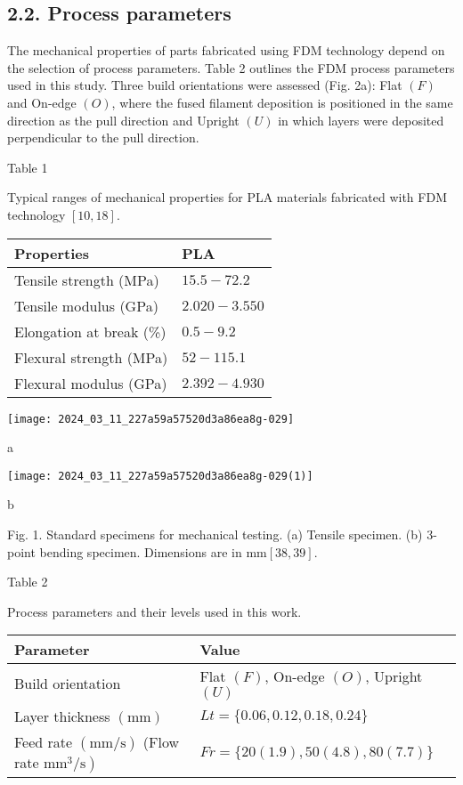 \documentclass[10pt]{article}
\begin{document}
\subsection*{2.2. Process parameters}
The mechanical properties of parts fabricated using FDM technology depend on the selection of process parameters. Table 2 outlines the FDM process parameters used in this study. Three build orientations were assessed (Fig. 2a): Flat $(F)$ and On-edge $(O)$, where the fused filament deposition is positioned in the same direction as the pull direction and Upright $(U)$ in which layers were deposited perpendicular to the pull direction.

Table 1

Typical ranges of mechanical properties for PLA materials fabricated with FDM technology $[10,18]$.

\begin{center}
\begin{tabular}{ll}
\hline
Properties & PLA \\
\hline
Tensile strength (MPa) & $15.5-72.2$ \\
Tensile modulus (GPa) & $2.020-3.550$ \\
Elongation at break (\%) & $0.5-9.2$ \\
Flexural strength (MPa) & $52-115.1$ \\
Flexural modulus (GPa) & $2.392-4.930$ \\
\hline
\end{tabular}
\end{center}

\begin{center}
\texttt{[image: 2024\_03\_11\_227a59a57520d3a86ea8g-029]}
\end{center}

a

\begin{center}
\texttt{[image: 2024\_03\_11\_227a59a57520d3a86ea8g-029(1)]}
\end{center}

b

Fig. 1. Standard specimens for mechanical testing. (a) Tensile specimen. (b) 3-point bending specimen. Dimensions are in $\mathrm{mm}[38,39]$.

Table 2

Process parameters and their levels used in this work.

\begin{center}
\begin{tabular}{ll}
\hline
Parameter & Value \\
\hline
Build orientation & Flat $(F)$, On-edge $(O)$, Upright $(U)$ \\
Layer thickness $(\mathrm{mm})$ & $L t=\{0.06,0.12,0.18,0.24\}$ \\
Feed rate $(\mathrm{mm} / \mathrm{s})$ (Flow rate $\left.\mathrm{mm}^{3} / \mathrm{s}\right)$ & $F r=\{20(1.9), 50(4.8), 80(7.7)\}$ \\
\hline
\end{tabular}
\end{center}
\end{document}
